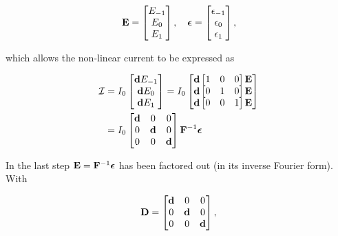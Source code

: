 \documentclass[12pt,journal,compsoc]{../ieeepaper/IEEEtran}
\begin{document}
\begin{equation}\label{eqn:ece1254projectReport:880}
\BE =
\begin{bmatrix}
E_{-1} \\
E_{0} \\
E_{1} \\
\end{bmatrix}, \quad
\Bepsilon =
\begin{bmatrix}
\epsilon_{-1} \\
\epsilon_{0} \\
\epsilon_{1} \\
\end{bmatrix},
\end{equation}

which allows the non-linear current to be expressed as

\begin{equation}\label{eqn:ece1254projectReport:900}
\begin{aligned}
\mathcal{I} &= 
I_0
\begin{bmatrix}
\Bd E_{-1} \\
\Bd E_{0} \\
\Bd E_{1} \\
\end{bmatrix}
=
I_0
\begin{bmatrix}
\Bd \begin{bmatrix} 1 & 0 & 0 \end{bmatrix} \BE \\
\Bd \begin{bmatrix} 0 & 1 & 0 \end{bmatrix} \BE \\
\Bd \begin{bmatrix} 0 & 0 & 1 \end{bmatrix} \BE
\end{bmatrix} \\
&=
I_0
\begin{bmatrix}
\Bd & 0 & 0 \\
0 & \Bd & 0 \\
0 & 0 & \Bd 
\end{bmatrix}
\BF^{-1} \Bepsilon
\end{aligned}
\end{equation}

In the last step \( \mathbf{E} = \mathbf{F}^{-1} \boldsymbol{\epsilon} \) has been factored out (in its inverse Fourier form).  With

\begin{dmath}\label{eqn:ece1254projectReport:920}
\BD =
\begin{bmatrix}
\Bd & 0 & 0 \\
0 & \Bd & 0 \\
0 & 0   & \Bd \\
\end{bmatrix},
\end{dmath}
\end{document}
